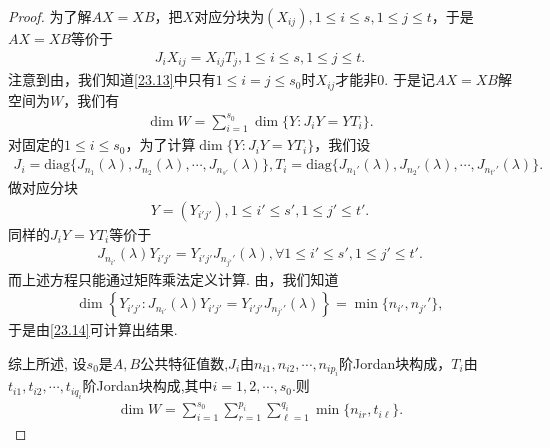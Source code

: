 \documentclass[../../main.tex]{subfiles}%
\begin{document}
\begin{proof}
为了解$AX = XB$，把$X$对应分块为$(X_{ij}), 1\leqslant i\leqslant s, 1\leqslant j\leqslant t$，于是$AX = XB$等价于
\begin{align}
J_iX_{ij} = X_{ij}T_j, 1\leqslant i\leqslant s, 1\leqslant j\leqslant t. \label{23.13}
\end{align}
注意到由，我们知道\eqref{23.13}中只有$1\leqslant i = j\leqslant s_0$时$X_{ij}$才能非$0$. 于是记$AX = XB$解空间为$W$，我们有
\begin{align}
\dim W = \sum_{i = 1}^{s_0}\dim\{Y : J_iY = YT_i\}. \label{23.14}
\end{align}
对固定的$1\leqslant i\leqslant s_0$，为了计算$\dim\{Y : J_iY = YT_i\}$，我们设
\begin{align*}
J_i = \mathrm{diag}\{J_{n_1}(\lambda), J_{n_2}(\lambda), \cdots, J_{n_{s'}}(\lambda)\}, T_i = \mathrm{diag}\{J_{n_1'}(\lambda), J_{n_2'}(\lambda), \cdots, J_{n_{t'}'}(\lambda)\}.
\end{align*}
做对应分块
\begin{align*}
Y = (Y_{i'j'}), 1\leqslant i'\leqslant s', 1\leqslant j'\leqslant t'.
\end{align*}
同样的$J_iY = YT_i$等价于
\begin{align}
J_{n_{i'}}(\lambda)Y_{i'j'} = Y_{i'j'}J_{n_{j'}'}(\lambda), \forall 1\leqslant i'\leqslant s', 1\leqslant j'\leqslant t'. \label{23.15}
\end{align}
而上述方程只能通过矩阵乘法定义计算. 由，我们知道
\begin{align*}
\dim\left\{Y_{i'j'} : J_{n_{i'}}(\lambda)Y_{i'j'} = Y_{i'j'}J_{n_{j'}'}(\lambda)\right\} = \min\{n_{i'}, n_{j'}'\},
\end{align*}
于是由\eqref{23.14}可计算出结果. 

综上所述,
设$s_0$是$A, B$公共特征值数,$J_i$由$n_{i1}, n_{i2}, \cdots, n_{ip_i}$阶Jordan块构成，$T_i$由$t_{i1}, t_{i2}, \cdots, t_{iq_i}$阶Jordan块构成,其中$i=1,2,\cdots,s_0$.则
\begin{align}
\dim W = \sum_{i = 1}^{s_0}\sum_{r = 1}^{p_i}\sum_{\ell = 1}^{q_i}\min\{n_{ir}, t_{i\ell}\}. \label{23.16}
\end{align}

\end{proof}
\end{document}
